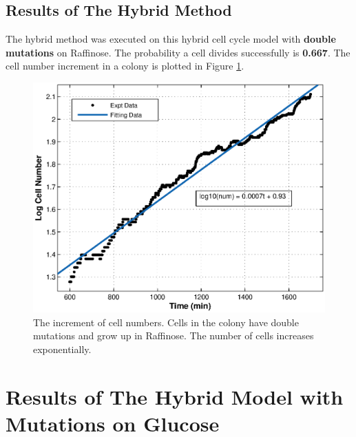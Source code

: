 \documentclass[12pt]{article}
\begin{document}
\subsection{Results of The Hybrid Method}
The hybrid method was executed on this hybrid cell cycle model with \textbf{double mutations} on Raffinose.
The probability a cell divides successfully is \textbf{0.667}. The cell number increment in a colony is 
plotted in Figure \ref{fig:rf_fit}.
\begin{figure}[H]
  \centering
  \includegraphics[scale=.8]{./figure/num_rf_fit.eps}
  \caption{The increment of cell numbers. Cells in the colony have double mutations and grow up in Raffinose.
  The number of cells increases exponentially.}
  \label{fig:rf_fit}
\end{figure}


\newpage
\section{Results of The Hybrid Model with Mutations on Glucose}
\end{document}
